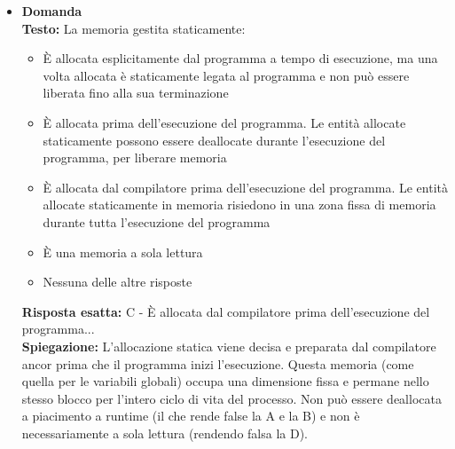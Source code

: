 \documentclass[12pt, a4paper]{article}
\newcounter{domandateoria}
\begin{document}
\begin{itemize}
    \item {}\textbf{Domanda \thedomandateoria} \\
    \textbf{Testo:} La memoria gestita staticamente:
    \begin{itemize}
        \item[A)] È allocata esplicitamente dal programma a tempo di esecuzione, ma una volta allocata è staticamente legata al programma e non può essere liberata fino alla sua terminazione
        \item[B)] È allocata prima dell'esecuzione del programma. Le entità allocate staticamente possono essere deallocate durante l'esecuzione del programma, per liberare memoria
        \item[C)] È allocata dal compilatore prima dell'esecuzione del programma. Le entità allocate staticamente in memoria risiedono in una zona fissa di memoria durante tutta l'esecuzione del programma
        \item[D)] È una memoria a sola lettura
        \item[E)] Nessuna delle altre risposte
    \end{itemize}
    \textbf{Risposta esatta:} C - È allocata dal compilatore prima dell'esecuzione del programma... \\
    \textbf{Spiegazione:} L'allocazione statica viene decisa e preparata dal compilatore ancor prima che il programma inizi l'esecuzione. Questa memoria (come quella per le variabili globali) occupa una dimensione fissa e permane nello stesso blocco per l'intero ciclo di vita del processo. Non può essere deallocata a piacimento a runtime (il che rende false la A e la B) e non è necessariamente a sola lettura (rendendo falsa la D).
    \vspace{0.3cm}

\newpage


\end{itemize}
\end{document}
